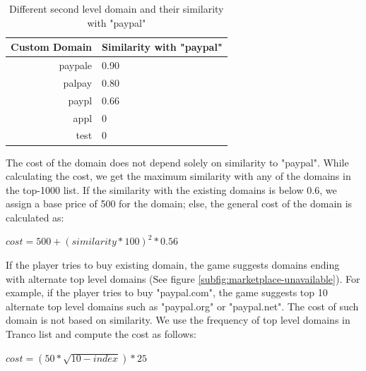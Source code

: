 \begin{table}[!ht]
    \centering
    \begin{tabular}{r|l}
        \textbf{Custom Domain} & \textbf{Similarity with "paypal"} \\
        \hline
        paypale                & 0.90                              \\
        palpay                 & 0.80                              \\
        paypl                  & 0.66                              \\
        appl                   & 0                                 \\
        test                   & 0                                 \\
    \end{tabular}
    \caption{Different second level domain and their similarity with "paypal"}
    \label{tab:dice}
\end{table}

The cost of the domain does not depend solely on similarity to "paypal". While calculating the cost, we get the maximum similarity with any of the domains in the top-1000 list. If the similarity with the existing domains is below 0.6, we assign a base price of 500 for the domain; else, the general cost of the domain is calculated as:
\begin{center}
    \begin{math}
        cost = 500 + (similarity *100)^2 * 0.56
    \end{math}
\end{center}

If the player tries to buy existing domain, the game suggests domains ending with alternate top level domains (See figure \ref{subfig:marketplace-unavailable}). For example, if the player tries to buy "paypal.com", the game suggests top 10 alternate top level domains such as "paypal.org" or "paypal.net". The cost of such domain is not based on similarity. We use the frequency of top level domains in Tranco list and compute the cost as follows:

\begin{center}
    \begin{math}
        cost = (50 * \sqrt{10-index}) *25
    \end{math}
\end{center}

